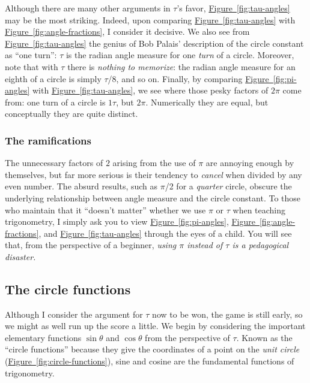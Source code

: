 \documentclass{article}
\begin{document}
Although there are many other arguments in $\tau$'s favor, \hyperref[fig:tau-angles]{Figure~}\ref{fig:tau-angles} may be the most striking. Indeed, upon comparing \hyperref[fig:tau-angles]{Figure~}\ref{fig:tau-angles} with \hyperref[fig:angle-fractions]{Figure~}\ref{fig:angle-fractions}, I consider it decisive. We also see from \hyperref[fig:tau-angles]{Figure~}\ref{fig:tau-angles} the genius of Bob Palais' description of the circle constant as ``one turn'': $\tau$ is the radian angle measure for one \emph{turn} of a circle. Moreover, note that with $\tau$ there is \emph{nothing to memorize}: the radian angle measure for an eighth of a circle is simply $\tau$/8, and so on. Finally, by comparing \hyperref[fig:pi-angles]{Figure~}\ref{fig:pi-angles} with \hyperref[fig:tau-angles]{Figure~}\ref{fig:tau-angles}, we see where those pesky factors of $2\pi$ come from: one turn of a circle is $1\tau$, but $2\pi$. Numerically they are equal, but conceptually they are quite distinct.

    \subsubsection{The ramifications} %
    \label{sec:the_ramifications}
    

The unnecessary factors of $2$ arising from the use of $\pi$ are annoying enough by themselves, but far more serious is their tendency to \emph{cancel} when divided by any even number. The absurd results, such as $\pi$/2 for a \emph{quarter} circle, obscure the underlying relationship between angle measure and the circle constant. To those who maintain that it ``doesn't matter'' whether we use $\pi$ or $\tau$ when teaching trigonometry, I simply ask you to view \hyperref[fig:pi-angles]{Figure~}\ref{fig:pi-angles}, \hyperref[fig:angle-fractions]{Figure~}\ref{fig:angle-fractions}, and \hyperref[fig:tau-angles]{Figure~}\ref{fig:tau-angles} through the eyes of a child. You will see that, from the perspective of a beginner, \emph{using $\pi$ instead of $\tau$ is a pedagogical disaster.}

  \subsection{The circle functions} %
  \label{sec:the_circle_functions}

Although I consider the argument for $\tau$ now to be won, the game is still early, so we might as well run up the score a little. We begin by considering the important elementary functions $\sin\theta$ and $\cos\theta$ from the perspective of $\tau$. Known as the ``circle functions''  because they give the coordinates of a point on the \emph{unit circle} (\hyperref[fig:circle-functions]{Figure~}\ref{fig:circle-functions}), sine and cosine are the fundamental functions of trigonometry.
\end{document}
